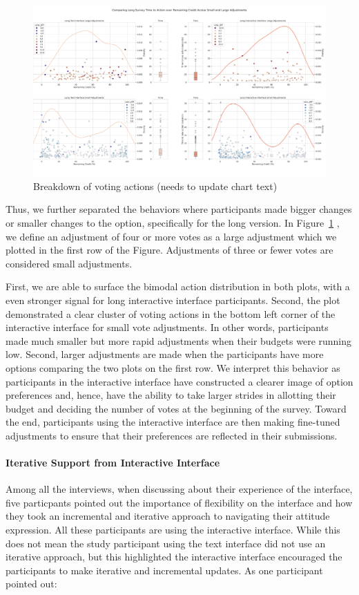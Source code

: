 \begin{figure}[ht]
    \centering
    \includegraphics[width=\textwidth]{content/image/results/combined_density_plots.pdf}
    \caption{Breakdown of voting actions (needs to update chart text)}
    \label{fig:voting_v3_v4}
\end{figure}

Thus, we further separated the behaviors where participants made bigger changes or smaller changes to the option, specifically for the long version. In Figure~\ref{fig:voting_v3_v4} , we define an adjustment of four or more votes as a large adjustment which we plotted in the first row of the Figure. Adjustments of three or fewer votes are considered small adjustments.

First, we are able to surface the bimodal action distribution in both plots, with a even stronger signal for long interactive interface participants. Second, the plot demonstrated a clear cluster of voting actions in the bottom left corner of the interactive interface for small vote adjustments. In other words, participants made much smaller but more rapid adjustments when their budgets were running low. Second, larger adjustments are made when the participants have more options comparing the two plots on the first row. We interpret this behavior as participants in the interactive interface have constructed a clearer image of option preferences and, hence, have the ability to take larger strides in allotting their budget and deciding the number of votes at the beginning of the survey. Toward the end, participants using the interactive interface are then making fine-tuned adjustments to ensure that their preferences are reflected in their submissions.

\paragraph{Iterative Support from Interactive Interface}
Among all the interviews, when discussing about their experience of the interface, five particpants pointed out the importance of flexibility on the interface and how they took an incremental and iterative approach to navigating their attitude expression. All these participants are using the interactive interface. While this does not mean the study participant using the text interface did not use an iterative approach, but this highlighted the interactive interface encouraged the participants to make iterative and incremental updates. As one participant pointed out:

